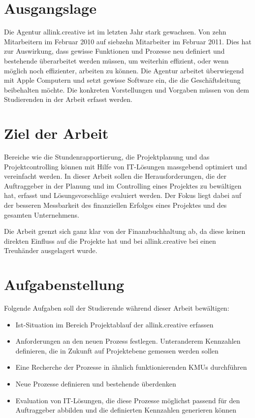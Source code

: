 \section{Ausgangslage}
Die Agentur allink.creative ist im letzten Jahr stark gewachsen. Von zehn
Mitarbeitern im Februar 2010 auf siebzehn Mitarbeiter im Februar 2011. Dies hat 
zur Auswirkung, dass gewisse Funktionen und Prozesse neu definiert und bestehende
überarbeitet werden müssen, um weiterhin effizient, oder wenn möglich noch 
effizienter, arbeiten zu können. Die Agentur arbeitet überwiegend mit Apple
Computern und setzt gewisse Software ein, die die Geschäftsleitung beibehalten 
möchte. Die konkreten Vorstellungen und Vorgaben müssen von dem Studierenden
in der Arbeit erfasst werden.

\section{Ziel der Arbeit}
Bereiche wie die Stundenrapportierung, die Projektplanung und das Projektcontrolling 
können mit Hilfe von IT-Lösungen massgebend optimiert und vereinfacht werden. 
In dieser Arbeit sollen die Herausforderungen, die der Auftraggeber in der 
Planung und im Controlling eines Projektes zu bewältigen hat, erfasst und 
Lösungsvorschläge evaluiert werden. Der Fokus liegt dabei auf der besseren 
Messbarkeit des finanziellen Erfolges eines Projektes und des gesamten 
Unternehmens.

Die Arbeit grenzt sich ganz klar von der Finanzbuchhaltung ab, da
diese keinen direkten Einfluss auf die Projekte hat und bei allink.creative 
bei einen Treuhänder ausgelagert wurde.

\section{Aufgabenstellung}
Folgende Aufgaben soll der Studierende während dieser Arbeit bewältigen:

\begin{itemize}
    \item Ist-Situation im Bereich Projektablauf der allink.creative erfassen
    \item Anforderungen an den neuen Prozess festlegen. Unteranderem Kennzahlen 
        definieren, die in Zukunft auf Projektebene gemessen werden sollen
    \item Eine Recherche der Prozesse in ähnlich funktionierenden KMUs durchführen
    \item Neue Prozesse definieren und bestehende überdenken
    \item Evaluation von IT-Lösungen, die diese Prozesse möglichst passend 
        für den Auftraggeber abbilden und die definierten Kennzahlen generieren können
\end{itemize}

